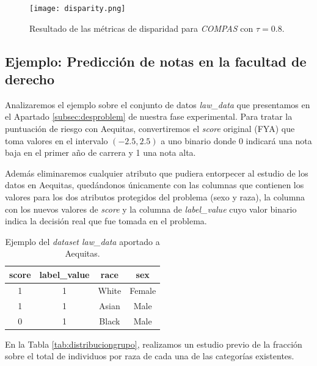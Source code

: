 \clearpage

\begin{figure}[h]
	\hspace{-2.5cm}
	\texttt{[image: disparity.png]}
	\caption{Resultado de las métricas de disparidad para \textit{COMPAS} con $\tau=0.8$.}
    \label{fig:compasdisparity}
\end{figure}

\subsection{Ejemplo: Predicción de notas en la facultad de derecho} \label{ap:facultadderecho}

Analizaremos el ejemplo sobre el conjunto de datos \textit{law\_data} que presentamos en el Apartado \ref{subsec:desproblem} de nuestra fase experimental. Para tratar la puntuación de riesgo con Aequitas, convertiremos el \textit{score} original (FYA) que toma valores en el intervalo $(-2.5,2.5)$ a uno binario donde 0 indicará una nota baja en el primer año de carrera y 1 una nota alta.

Además eliminaremos cualquier atributo que pudiera entorpecer al estudio de los datos en Aequitas, quedándonos  únicamente con las columnas que contienen los valores para los dos atributos protegidos del problema (sexo y raza), la columna con los nuevos valores de \textit{score} y la columna de \textit{label\_value} cuyo valor binario indica la decisión real que fue tomada en el problema.

\clearpage

\begin{table}[h]
\centering
\resizebox{7.5cm}{!} {
\begin{tabular}{|c|c|c|c|}
\hline
\textbf{score} & \textbf{label\_value} & \textbf{race}    & \textbf{sex} \\ \hline
1            & 1                     & White & Female       \\ \hline
1              & 1                     & Asian         & Male      \\ \hline
0              & 1                     & Black       & Male              \\ \hline
\end{tabular}
}
\caption{Ejemplo del \textit{dataset law\_data} aportado a Aequitas.}
\label{tab:ejlawaeq}
\end{table}

En la Tabla \ref{tab:distribuciongrupo}, realizamos un estudio previo de la fracción sobre el total de individuos por raza de cada una de las categorías existentes.\\

